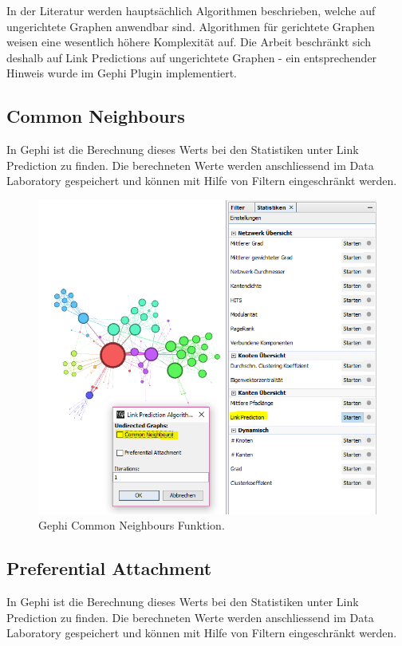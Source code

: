 In der Literatur werden hauptsächlich Algorithmen beschrieben, welche auf ungerichtete Graphen anwendbar sind. Algorithmen für gerichtete Graphen weisen eine wesentlich höhere Komplexität auf. Die Arbeit beschränkt sich deshalb auf Link Predictions auf ungerichtete Graphen -
ein entsprechender Hinweis wurde im Gephi Plugin implementiert.

\subsection{Common Neighbours}
In Gephi ist die Berechnung dieses Werts bei den Statistiken unter Link Prediction zu finden. Die berechneten Werte
werden anschliessend im Data Laboratory gespeichert und können mit Hilfe von Filtern eingeschränkt werden.

\begin{figure}[htbp]
    \includegraphics[width=\linewidth]{resources/gephi-CN.png}
    \caption{Gephi Common Neighbours Funktion.}
    \label{fig:screen8}
\end{figure}

\subsection{Preferential Attachment}
In Gephi ist die Berechnung dieses Werts bei den Statistiken unter Link Prediction zu finden. Die berechneten Werte
werden anschliessend im Data Laboratory gespeichert und können mit Hilfe von Filtern eingeschränkt werden.

